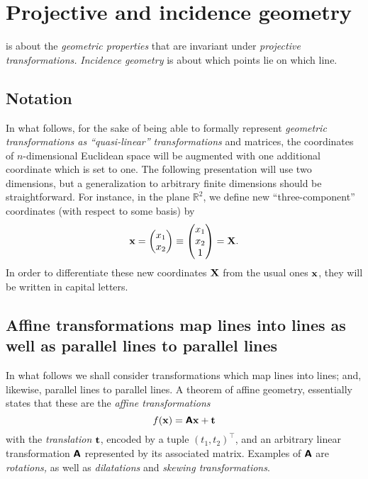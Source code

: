 \chapter{Projective and incidence geometry}
\label{2012-m-ch-projgeom}

 is about the {\em geometric properties} that are invariant under
{\em projective transformations.}
{\em Incidence geometry} is about which points lie on which line.

\section{Notation}
In what follows, for the sake of being able to formally represent {\em geometric transformations as
``quasi-linear'' transformations} and matrices,
the coordinates of $n$-dimensional Euclidean space will be augmented with one additional coordinate
which is set to one.
The following presentation will use two dimensions, but a generalization to arbitrary finite dimensions should be straightforward.
For instance, in the plane $\mathbb{R}^2$, we define new ``three-component'' coordinates
(with respect to some basis) by
\begin{equation}
{\bf x} =
\begin{pmatrix}
x_1\\
x_2
\end{pmatrix}
\equiv
\begin{pmatrix}
x_1\\
x_2 \\
1
\end{pmatrix}
 =  {\bf X}
.
\end{equation}
In order to differentiate these new coordinates ${\bf X}$
from the usual ones ${\bf x}$, they will be written in capital letters.



\section{Affine transformations map lines into lines as well as parallel lines to parallel lines}

In what follows we shall consider transformations which map lines into lines; and, likewise,
parallel lines to parallel lines.
A theorem of affine geometry,\cite[-40mm]{Stothers-ag,Gruenberg-77,Artstein-Avidan-2016}
essentially states that these are the {\em affine transformations}
\begin{equation}
f({\bf x})
=   \textsf{\textbf{A}}{\bf x} + {\bf t}
\end{equation}
with the {\em translation}
  ${\bf t}$, encoded by a tuple $(t_1,t_2)^\intercal $,
and an arbitrary linear transformation
$\textsf{\textbf{A}}$ represented by its associated matrix.
Examples of $\textsf{\textbf{A}}$ are
 {\em rotations,} as well as {\em dilatations}  and {\em skewing transformations}.

